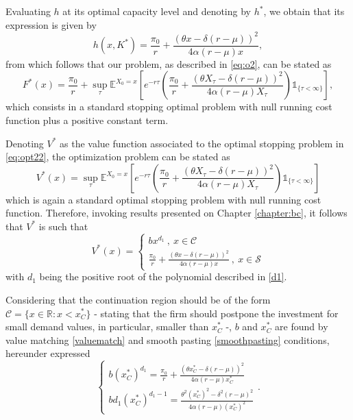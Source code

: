 Evaluating $h$ at its optimal capacity level and denoting by $h^*$, we obtain that its expression is given by
\begin{equation}
h(x,K^*)=\frac{\pi_0}{r} + \frac{(\theta x -\delta (r-\mu))^2}{4 \alpha (r-\mu) x}
,
\label{2_h*} 
\end{equation}
from which follows that our problem, as described in \eqref{eq:o2}, can be stated as
\begin{equation}
F^*(x)=\frac{\pi_0}{r}+ \sup _\tau \mathds{E}^{X_0=x} \left[ e^{-r\tau}   \left( \frac{\pi_0}{r} + \frac{(\theta X_\tau -\delta (r-\mu))^2}{4 \alpha (r-\mu) X_\tau} \right) \mathds{1}_{ \{\tau < \infty \} } \right],
\label{eq:opt22}
\end{equation}
which consists in a standard stopping optimal problem with null running cost function plus a positive constant term.


Denoting $V^*$ as the value function associated to the optimal stopping problem in \eqref{eq:opt22}, the optimization problem can be stated as
\begin{equation}
V^*(x)=\sup _\tau \mathds{E}^{X_0=x} \left[ e^{-r\tau}   \left( \frac{\pi_0}{r} + \frac{(\theta X_\tau -\delta (r-\mu))^2}{4 \alpha (r-\mu) X_\tau} \right) \mathds{1}_{ \{\tau < \infty \} } \right]
\label{2_V*}
\end{equation}
which is again a standard optimal stopping problem with null running cost function. Therefore, invoking results presented on Chapter \ref{chapter:bc}, it follows that $V^*$ is such that
\begin{equation}
V^*(x)=\begin{cases} b x^{d_1}  \ , \ x \in \mathcal{C} \\
\frac{\pi_0}{r}+ \frac{(\theta x -\delta (r-\mu))^2}{4 \alpha (r-\mu) x} \ , \ x \in \mathcal{S}
\end{cases}
\label{2_V*3}
\end{equation}
with $d_1$ being the positive root of the polynomial described in \eqref{d1}.

Considering that the continuation region should be of the form $\mathcal{C}= \{ x \in \mathds{R}: x< x^*_C \}$ - stating that the firm should postpone the investment for small demand values, in particular, smaller than $x_C^*$ -, $b$ and $x_C^*$ are found by value matching \eqref{valuematch} and smooth pasting \eqref{smoothpasting} conditions, hereunder expressed
\begin{equation}
\begin{cases} b (x_C^*)^{d_1}=\frac{\pi_0}{r} + \frac{(\theta x_C^* -\delta (r-\mu))^2}{4 \alpha (r-\mu) x_C^*}\\
b d_1(x_C^*)^{d_1-1}=\frac{\theta^2 (x_C^*)^2 -\delta^2 (r-\mu)^2}{4 \alpha (r-\mu) (x_C^*)^2}
\end{cases}
.
\label{eq:2_sistema}
\end{equation}

